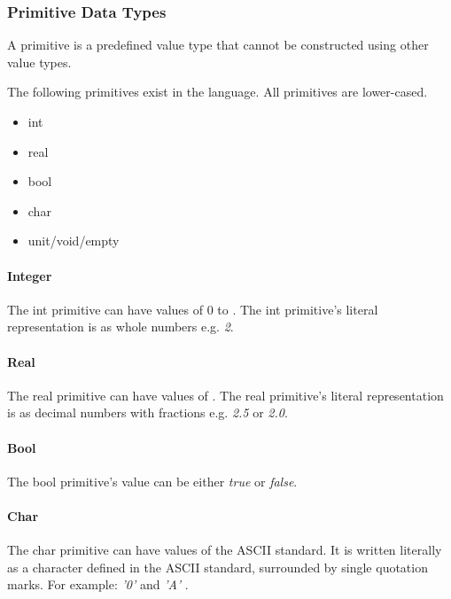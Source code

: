 \subsubsection{Primitive Data Types}
\label{subsec:primitives}

A primitive is a predefined value type that cannot be constructed using other value types.

The following primitives exist in the language. All primitives are lower-cased.

\begin{itemize}
  \item int
  \item real
  \item bool
  \item char
  \item unit/void/empty 
\end{itemize}

\paragraph{Integer}
\label{subsubsec:int}

The int primitive can have values of 0 to . The int primitive's literal representation is as whole numbers e.g. \emph{2}.

\paragraph{Real}
\label{subsubsec:real}

The real primitive can have values of . The real primitive's literal representation is as decimal numbers with fractions e.g. \emph{2.5} or \emph{2.0}.

\paragraph{Bool}
\label{subsubsec:bool}

The bool primitive's value can be either \emph{true} or \emph{false}.

\paragraph{Char}
\label{sec:char}

The char primitive can have values of the ASCII standard. It is written literally as a character defined in the ASCII standard, surrounded by single quotation marks. For example: \emph{ '0' } and \emph{ 'A' }.

